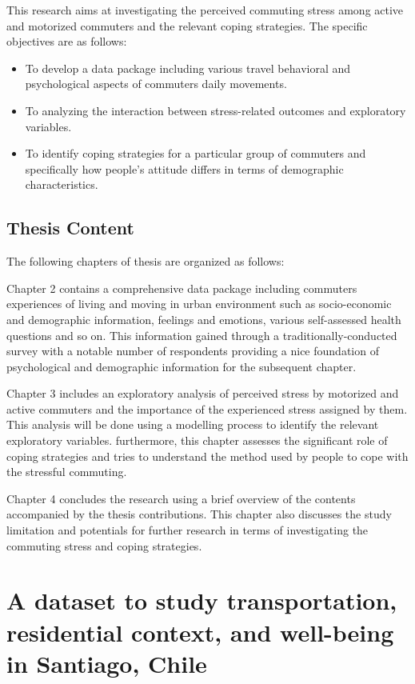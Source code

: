 \documentclass[
11pt, %
oneside, %
english, %
singlespacing, %
]{macthesis} %
\begin{document}
This research aims at investigating the perceived commuting stress among active and motorized commuters and the relevant coping strategies. The specific objectives are as follows:
\begin{itemize}
\item
  To develop a data package including various travel behavioral and psychological aspects of commuters daily movements.
\item
  To analyzing the interaction between stress-related outcomes and exploratory variables.
\item
  To identify coping strategies for a particular group of commuters and specifically how people's attitude differs in terms of demographic characteristics.
\end{itemize}
\hypertarget{thesis-content}{%
\section{Thesis Content}\label{thesis-content}}

The following chapters of thesis are organized as follows:

Chapter 2 contains a comprehensive data package including commuters experiences of living and moving in urban environment such as socio-economic and demographic information, feelings and emotions, various self-assessed health questions and so on. This information gained through a traditionally-conducted survey with a notable number of respondents providing a nice foundation of psychological and demographic information for the subsequent chapter.

Chapter 3 includes an exploratory analysis of perceived stress by motorized and active commuters and the importance of the experienced stress assigned by them. This analysis will be done using a modelling process to identify the relevant exploratory variables. furthermore, this chapter assesses the significant role of coping strategies and tries to understand the method used by people to cope with the stressful commuting.

Chapter 4 concludes the research using a brief overview of the contents accompanied by the thesis contributions. This chapter also discusses the study limitation and potentials for further research in terms of investigating the commuting stress and coping strategies.

\hypertarget{a-dataset-to-study-transportation-residential-context-and-well-being-in-santiago-chile}{%
\chapter{A dataset to study transportation, residential context, and well-being in Santiago, Chile}\label{a-dataset-to-study-transportation-residential-context-and-well-being-in-santiago-chile}}
\end{document}
